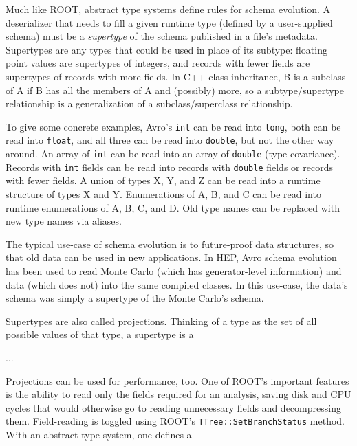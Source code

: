 \documentclass{article}
\begin{document}
Much like ROOT, abstract type systems define rules for schema evolution. A deserializer that needs to fill a given runtime type (defined by a user-supplied schema) must be a {\it supertype} of the schema published in a file's metadata. Supertypes are any types that could be used in place of its subtype: floating point values are supertypes of integers, and records with fewer fields are supertypes of records with more fields. In C++ class inheritance, B is a subclass of A if B has all the members of A and (possibly) more, so a subtype/supertype relationship is a generalization of a subclass/superclass relationship.

To give some concrete examples, Avro's {\tt int} can be read into {\tt long}, both can be read into {\tt float}, and all three can be read into {\tt double}, but not the other way around. An array of {\tt int} can be read into an array of {\tt double} (type covariance). Records with {\tt int} fields can be read into records with {\tt double} fields or records with fewer fields. A union of types X, Y, and Z can be read into a runtime structure of types X and Y. Enumerations of A, B, and C can be read into runtime enumerations of A, B, C, and D. Old type names can be replaced with new type names via aliases.

The typical use-case of schema evolution is to future-proof data structures, so that old data can be used in new applications. In HEP, Avro schema evolution has been used to read Monte Carlo (which has generator-level information) and data (which does not) into the same compiled classes. In this use-case, the data's schema was simply a supertype of the Monte Carlo's schema.

Supertypes are also called projections. Thinking of a type as the set of all possible values of that type, a supertype is a 

...





Projections can be used for performance, too. One of ROOT's important features is the ability to read only the fields required for an analysis, saving disk and CPU cycles that would otherwise go to reading unnecessary fields and decompressing them. Field-reading is toggled using ROOT's {\tt TTree::SetBranchStatus} method. With an abstract type system, one defines a 
\end{document}
